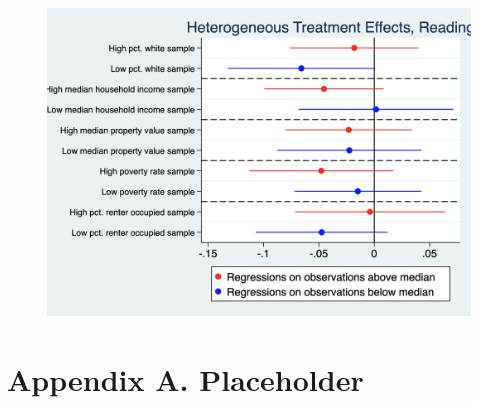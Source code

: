 \documentclass[12pt]{article}
\begin{document}
\begin{landscape}

\begin{figure}
    \centering
    \includegraphics[scale=0.5]{output/graphs/read_heterogeneous_effects.png}
    \caption{}
    \label{fig:my_label}
\end{figure}
\end{landscape}
\section*{Appendix A. Placeholder} \label{sec:appendixa}

\end{document}
